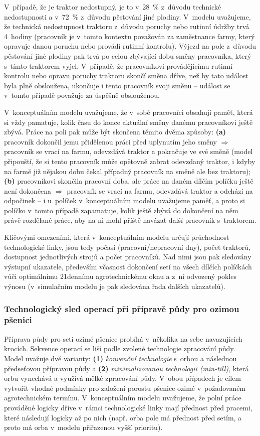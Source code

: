 \documentclass[11pt,a4paper]{article}
\begin{document}
V~případě, že je traktor nedostupný, je to v~28~\% z~důvodu technické nedostupnosti a v~72~\% z~důvodu pěstování jiné plodiny. V~modelu uvažujeme, že technická nedostupnost traktoru z~důvodu poruchy nebo rutinní údržby trvá 4~hodiny (pracovník je v~tomto kontextu považován za zaměstnance farmy, který opravuje danou poruchu nebo provádí rutinní kontrolu). Výjezd na pole z~důvodu pěstování jiné plodiny pak trvá po celou zbývající dobu směny pracovníka, který s~tímto traktorem vyjel. V~případě, že pracovníkovi provádějícímu rutinní kontrolu nebo opravu poruchy traktoru skončí směna dříve, než by tato událost byla plně obsloužena, ukončuje i tento pracovník svoji směnu -- událost se v~tomto případě považuje za úspěšně obslouženou.

V~konceptuálním modelu uvažujeme, že v~sobě pracovníci obsahují paměť, která si vždy pamatuje, kolik času do konce aktuální směny danému pracovníkovi ještě zbývá. Práce na poli pak může být skončena těmito dvěma způsoby: \textbf{(a)} pracovník dokončil jemu přidělenou práci před uplynutím jeho směny $\Rightarrow$ pracovník se vrací na farmu, odevzdává traktor a pokračuje ve své směně (model připouští, že si tento pracovník může opětovně zabrat odevzdaný traktor, i kdyby na farmě již nějakou dobu čekal případný pracovník na směně ale bez traktoru); \textbf{(b)} pracovníkovi skončila pracovní doba, ale práce na daném dílčím políčku ještě není dokončena $\Rightarrow$ pracovník se vrací na farmu, odevzdává traktor a odchází na odpočinek -- i u~políček v~konceptuálním modelu uvažujeme paměť, a proto si políčko v~tomto případě zapamatuje, kolik ještě zbývá do dokončení na něm právě rozdělané práce, aby na ni mohl příště navázat další pracovník s~traktorem.

Klíčovými omezeními, která v~konceptuálním modelu určují průchodnost technologické linky, jsou tedy počasí (pracovní/nepracovní dny), počet traktorů, dostupnost jednotlivých strojů a počet pracovníků. Nad nimi jsou pak sledovány výstupní ukazatele, především včasnost dokončení setí na všech dílčích políčkách vůči optimálnímu 21dennímu agrotechnickému oknu a z~ní odvozený pokles výnosu (v~simulačním modelu je pak sledována řada dalších ukazatelů).

\subsubsection{Technologický sled operací při přípravě půdy pro ozimou pšenici}

Příprava půdy pro setí ozimé pšenice probíhá v~několika na sebe navazujících krocích. Sekvence operací se liší podle zvolené technologie zpracování půdy. Model uvažuje dvě varianty: \textbf{(1)} \emph{konvenční technologie} s~orbou a následnou předseťovou přípravou půdy a \textbf{(2)} \emph{minimalizovanou technologii (min-till)}, která orbu vynechává a využívá mělké zpracování půdy. V~obou případech je cílem vytvořit vhodné podmínky pro založení porostu pšenice ozimé v~požadovaném agrotechnickém termínu. V~konceptuálním modelu uvažujeme, že polní práce prováděné logicky dříve v~rámci technologické linky mají přednost před pracemi, které následují logicky až po nich (např. orba pole má přednost před setím, a proto má orba v~modelu přiřazenou vyšší prioritu).
\end{document}
